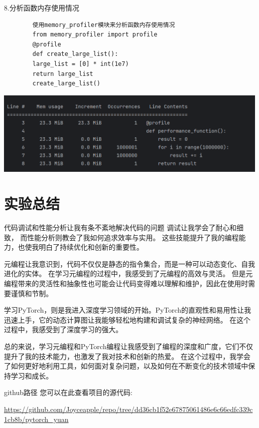 \documentclass{article}
\begin{document}
	8.分析函数内存使用情况
	\begin{verbatim}
		使用memory_profiler模块来分析函数内存使用情况
		from memory_profiler import profile
		@profile
		def create_large_list():
		large_list = [0] * int(1e7)
		return large_list
		create_large_list()
	\end{verbatim}
	
	\noindent
	\begin{minipage}{\linewidth}
		\centering
		\includegraphics[width=0.5\linewidth]{example20.png}
		\label{fig:example}
	\end{minipage}
	
	\section{实验总结}
	代码调试和性能分析让我有条不紊地解决代码的问题
	调试让我学会了耐心和细致，
	而性能分析则教会了我如何追求效率与实用。
	这些技能提升了我的编程能力，也使我明白了持续优化和创新的重要性。
	
	元编程让我意识到，代码不仅仅是静态的指令集合，而是一种可以动态变化、自我进化的实体。
	在学习元编程的过程中，我感受到了元编程的高效与灵活。
	但是元编程带来的灵活性和抽象性也可能会让代码变得难以理解和维护，因此在使用时需要谨慎和节制。
	
	学习PyTorch，则是我进入深度学习领域的开始。PyTorch的直观性和易用性让我迅速上手，它的动态计算图让我能够轻松地构建和调试复杂的神经网络。
	在这个过程中，我感受到了深度学习的强大。
	
	总的来说，学习元编程和PyTorch编程让我感受到了编程的深度和广度，它们不仅提升了我的技术能力，也激发了我对技术和创新的热爱。
	在这个过程中，我学会了如何更好地利用工具，如何面对复杂问题，以及如何在不断变化的技术领域中保持学习和成长。
	
	github路径
	您可以在此查看项目的源代码: 
	
	\url{https://github.com/Joyceapple/repo/tree/dd36cb1f52e67875061486e6c66edfc339c1cb8b/pytorch_yuan}
	
	
\end{document}

